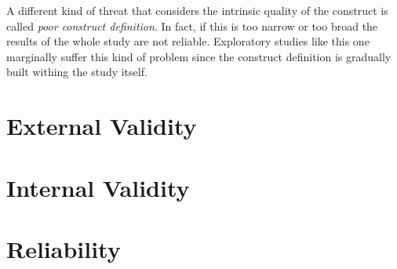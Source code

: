     A different kind of threat that considers the intrinsic quality of the construct is called \textit{poor construct definition}. In fact, if this is too narrow or too broad the results of the whole study are not reliable. Exploratory studies like this one marginally suffer this kind of problem since the construct definition is gradually built withing the study itself.

\section{External Validity}

\section{Internal Validity}

\section{Reliability}